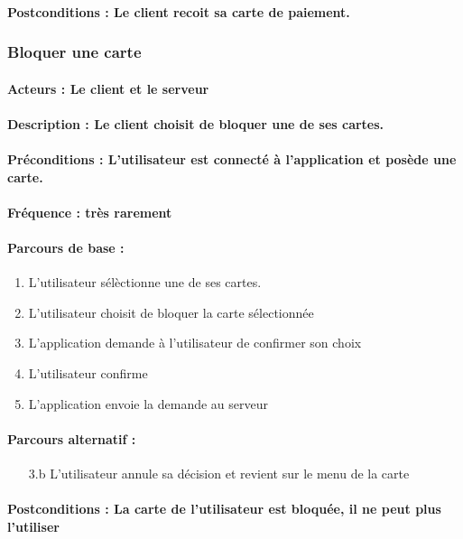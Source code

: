 \documentclass[../annexe.tex]{subfiles}
\begin{document}
\paragraph{Postconditions : Le client recoit sa carte de paiement.}

\subsubsection{Bloquer une carte}
\paragraph{Acteurs : Le client et le serveur}
\paragraph{Description : Le client choisit de bloquer une de ses cartes.} 
\paragraph{Préconditions : L'utilisateur est connecté à l'application et posède une carte.}
\paragraph{Fréquence : très rarement}
\paragraph{Parcours de base :}
\begin{enumerate}
	\item{L'utilisateur sélèctionne une de ses cartes.}
	\item{L'utilisateur choisit de bloquer la carte sélectionnée}
	\item{L'application demande à l'utilisateur de confirmer son choix}
	\item{L'utilisateur confirme}
	\item{L'application envoie la demande au serveur}
\end{enumerate}
\paragraph{Parcours alternatif :}
\begin{itemize}
	\item[3.b]{L'utilisateur annule sa décision et revient sur le menu de la carte}
\end{itemize}
\paragraph{Postconditions : La carte de l'utilisateur est bloquée, il ne peut plus l'utiliser}
\end{document}
